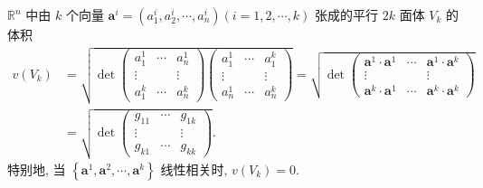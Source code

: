 \begin{lemma}\label{lem:11.1.2}
$\mathbb{R}^{n}$ 中由 $k$ 个向量 $\boldsymbol{a}^{i}=\left(a_{1}^{i}, a_{2}^{i}, \cdots, a_{n}^{i}\right)(i=1,2, \cdots, k)$ 张成的平行 $2 k$ 面体 $V_{k}$ 的体积
\begin{align*}
  v\left(V_{k}\right) &=\sqrt{\operatorname{det}\begin{pmatrix}
      a_{1}^{1} & \cdots & a_{n}^{1} \\
      \vdots & & \vdots \\
      a_{1}^{k} & \cdots & a_{n}^{k}
    \end{pmatrix}
    \begin{pmatrix}
      a_{1}^{1} & \cdots & a_{1}^{k} \\
      \vdots & & \vdots \\
      a_{n}^{1} & \cdots & a_{n}^{k}
    \end{pmatrix}}=\sqrt{\operatorname{det}\begin{pmatrix}
      \boldsymbol{a}^{1} \cdot \boldsymbol{a}^{1} & \cdots & \boldsymbol{a}^{1} \cdot \boldsymbol{a}^{k} \\
      \vdots & & \vdots \\
      \boldsymbol{a}^{k} \cdot \boldsymbol{a}^{1} & \cdots & \boldsymbol{a}^{k} \cdot \boldsymbol{a}^{k}
    \end{pmatrix}} \\
  &=\sqrt{\operatorname{det}\begin{pmatrix}
      g_{11} & \cdots & g_{1 k} \\
      \vdots & & \vdots \\
      g_{k 1} & \cdots & g_{k k}
    \end{pmatrix}}.
\end{align*}
特别地, 当 $\left\{\boldsymbol{a}^{1}, \boldsymbol{a}^{2}, \cdots, \boldsymbol{a}^{k}\right\}$ 线性相关时, $v\left(V_{k}\right)=0$.
\end{lemma}

